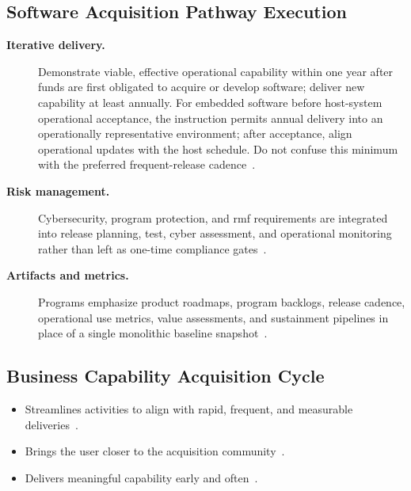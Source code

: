 \documentclass[../main.tex]{subfiles}
\begin{document}

\subsection{Software Acquisition Pathway Execution}
\begin{description}
  \item[\textbf{Iterative delivery.}] Demonstrate viable, effective operational capability within one year after funds are first obligated to acquire or develop software; deliver new capability at least annually. For embedded software before host-system operational acceptance, the instruction permits annual delivery into an operationally representative environment; after acceptance, align operational updates with the host schedule. Do not confuse this minimum with the preferred frequent-release cadence~\autocite{DoDI5000-87,USC-10-3603}.
  \item[\textbf{Risk management.}] Cybersecurity, program protection, and \ac{rmf} requirements are integrated into release planning, test, cyber assessment, and operational monitoring rather than left as one-time compliance gates~\autocite{edo-3-4-1-software-acquisition-environment-2025,DoDI5000-87}.
  \item[\textbf{Artifacts and metrics.}] Programs emphasize product roadmaps, program backlogs, release cadence, operational use metrics, value assessments, and sustainment pipelines in place of a single monolithic baseline snapshot~\autocite{edo-3-4-1-software-acquisition-environment-2025,DoDI5000-87}.
\end{description}

\subsection{Business Capability Acquisition Cycle}
\begin{itemize}
  \item Streamlines activities to align with rapid, frequent, and measurable deliveries~\autocite{edo-3-4-1-software-acquisition-environment-2025}.
  \item Brings the user closer to the acquisition community~\autocite{edo-3-4-1-software-acquisition-environment-2025}.
  \item Delivers meaningful capability early and often~\autocite{edo-3-4-1-software-acquisition-environment-2025}.
\end{itemize}
\end{document}
